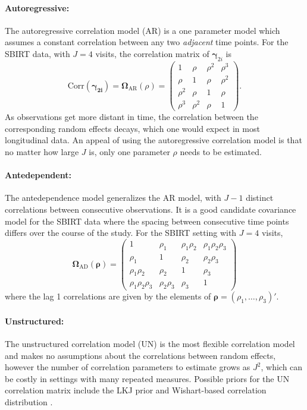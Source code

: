\documentclass[12pt]{article}
\begin{document}
\paragraph{Autoregressive:}
The autoregressive correlation model (AR) is a one parameter model which assumes a constant correlation between any two \textit{adjacent} time points. For the SBIRT data, with $J=4$ visits, the correlation matrix of $\bm{\gamma}_{2i}$ is
\begin{equation*}
	\text{Corr}(\bm{\gamma_{2i}}) = \bm{\Omega}_{\text{AR}}(\rho) =
	\begin{pmatrix}
		1 & \rho & \rho^{2} & \rho^{3} \\
		\rho & 1 & \rho & \rho^{2}\\
		\rho^{2} & \rho & 1 & \rho \\
		\rho^{3} & \rho^{2} & \rho & 1
	\end{pmatrix}.
\end{equation*}
As observations get more distant in time, the correlation between the corresponding random effects decays, which one would expect in most longitudinal data. An appeal of using the autoregressive correlation model is that no matter how large $J$ is, only one parameter $\rho$ needs to be estimated. 
\paragraph{Antedependent:}
The antedependence model generalizes the AR model, with $J-1$ distinct correlations between consecutive observations. It is a good candidate covariance model for the SBIRT data where the spacing between consecutive time points differs over the course of the study. For the SBIRT setting with $J=4$ visits,
\begin{equation*}
	\bm{\Omega}_{\text{AD}}(\bm{\rho})= 
	\begin{pmatrix}
		1 & \rho_{1} & \rho_{1} \rho_{2} & \rho_{1} \rho_{2} \rho_{3}\\
		\rho_{1} & 1 & \rho_{2} & \rho_{2} \rho_{3}\\
		\rho_{1} \rho_{2} & \rho_{2} & 1 & \rho_{3} \\
		\rho_{1} \rho_{2} \rho_{3} & \rho_{2} \rho_{3} & \rho_{3} & 1
	\end{pmatrix}
\end{equation*}
where the lag 1 correlations are given by the elements of $\bm{\rho} = (\rho_{1}, \dots, \rho_{3})'$.

\paragraph{Unstructured:}
The unstructured correlation model (UN) is the most flexible correlation model and makes no assumptions about the correlations between random effects, however the number of correlation parameters to estimate grows as $J^2$, which can be costly in settings with many repeated measures. Possible priors for the UN correlation matrix include the LKJ prior \citep{lewandowski2009generating} and Wishart-based correlation distribution \citep{zhang2006sampling}.
\end{document}
